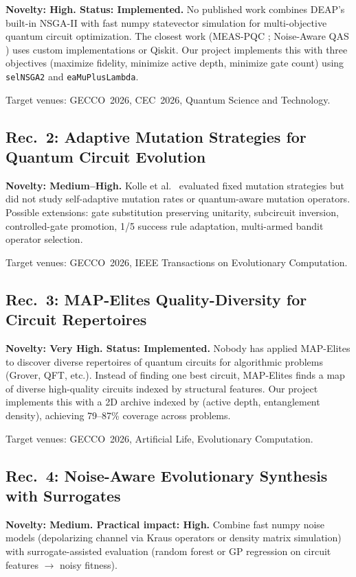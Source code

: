 \documentclass[11pt]{article}
\begin{document}
\textbf{Novelty: High. Status: Implemented.}
No published work combines DEAP's built-in NSGA-II with fast numpy statevector simulation for multi-objective quantum circuit optimization. The closest work (MEAS-PQC \cite{measpqc2023}; Noise-Aware QAS \cite{noiseaware2026}) uses custom implementations or Qiskit.
Our project implements this with three objectives (maximize fidelity, minimize active depth, minimize gate count) using \texttt{selNSGA2} and \texttt{eaMuPlusLambda}.

Target venues: GECCO~2026, CEC~2026, Quantum Science and Technology.

\subsection{Rec.\ 2: Adaptive Mutation Strategies for Quantum Circuit Evolution}

\textbf{Novelty: Medium--High.}
Kolle et al.\ \cite{kolle2025mutation} evaluated fixed mutation strategies but did not study self-adaptive mutation rates or quantum-aware mutation operators.
Possible extensions: gate substitution preserving unitarity, subcircuit inversion, controlled-gate promotion, 1/5 success rule adaptation, multi-armed bandit operator selection.

Target venues: GECCO~2026, IEEE Transactions on Evolutionary Computation.

\subsection{Rec.\ 3: MAP-Elites Quality-Diversity for Circuit Repertoires}

\textbf{Novelty: Very High. Status: Implemented.}
Nobody has applied MAP-Elites to discover diverse repertoires of quantum circuits for algorithmic problems (Grover, QFT, etc.). Instead of finding one best circuit, MAP-Elites finds a map of diverse high-quality circuits indexed by structural features.
Our project implements this with a 2D archive indexed by (active depth, entanglement density), achieving 79--87\% coverage across problems.

Target venues: GECCO~2026, Artificial Life, Evolutionary Computation.

\subsection{Rec.\ 4: Noise-Aware Evolutionary Synthesis with Surrogates}

\textbf{Novelty: Medium. Practical impact: High.}
Combine fast numpy noise models (depolarizing channel via Kraus operators or density matrix simulation) with surrogate-assisted evaluation (random forest or GP regression on circuit features $\to$ noisy fitness).
\end{document}
